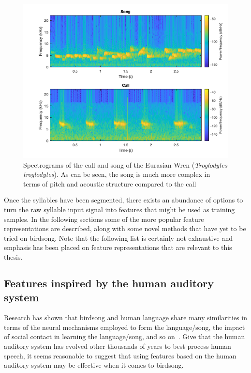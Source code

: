 \begin{figure}[ht]
  \centering
  \includegraphics[width=\textwidth]{figures/wren_call_song_spectrogram.png}
  \caption{Spectrograms of the call and song of the Eurasian Wren
    (\textit{Troglodytes troglodytes}). As can be seen, the song is much more complex in terms of pitch and acoustic structure compared to the
  call}\label{fig:wren_call_song_spectrogram}
\end{figure}

Once the syllables have been segmented, there exists an abundance of options to
turn the raw syllable input signal into features that might be used as training
samples. In the following sections some of the more popular feature
representations are described, along with some novel methods that have yet to be
tried on birdsong. Note that the following list is certainly not exhaustive and
emphasis has been placed on feature representations that are relevant to this
thesis.

\subsection{Features inspired by the human auditory system}

Research has shown that birdsong and human language share many similarities in
terms of the neural mechanisms employed to form the language/song, the impact of
social contact in learning the language/song, and so on~\cite{birdsongspeech}.
Give that the human auditory system has evolved other thousands of years to best
process human speech, it seems reasonable to suggest that using features based
on the human auditory system may be effective when it comes to birdsong.

